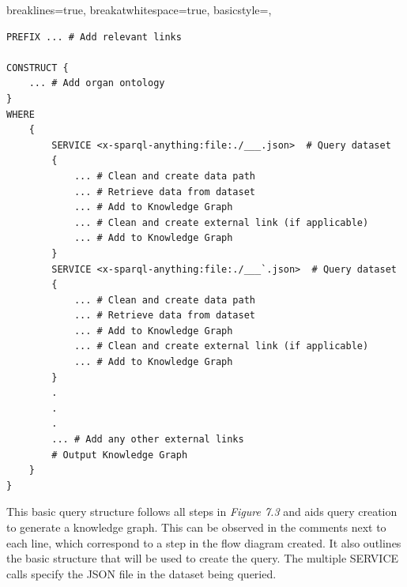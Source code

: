 \lstset
{
    breaklines=true,
    breakatwhitespace=true,
    basicstyle=\linespread{1.25}\ttfamily,
}
\begin{lstlisting} 
PREFIX ... # Add relevant links

CONSTRUCT {
    ... # Add organ ontology
} 
WHERE 
    { 
        SERVICE <x-sparql-anything:file:./___.json>  # Query dataset
        { 
            ... # Clean and create data path
            ... # Retrieve data from dataset
            ... # Add to Knowledge Graph
            ... # Clean and create external link (if applicable)
            ... # Add to Knowledge Graph
        } 
        SERVICE <x-sparql-anything:file:./___`.json>  # Query dataset
        { 
            ... # Clean and create data path
            ... # Retrieve data from dataset
            ... # Add to Knowledge Graph
            ... # Clean and create external link (if applicable)
            ... # Add to Knowledge Graph
        } 
        .
        .
        .
        ... # Add any other external links 
        # Output Knowledge Graph
    }
}
\end{lstlisting}

This basic query structure follows all steps in \textit{Figure 7.3} and aids query creation to generate a knowledge graph. This can be observed in the comments next to each line, which correspond to a step in the flow diagram created. It also outlines the basic structure that will be used to create the query. The multiple SERVICE calls specify the  JSON file in the dataset being queried. 

